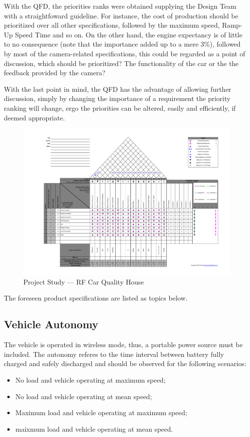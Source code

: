 With the QFD, the priorities ranks were obtained supplying the Design Team with a
straightfoward guideline. For instance, the cost of production should be
prioritized over all other specifications, followed by the maximum speed,
Ramp-Up Speed Time and so on.  On the other hand, the engine expectancy is of
little to no consequence (note that the importance added up to a mere 3\%),
followed by most of the camera-related specifications, this could be regarded as
a point of discussion, which should be prioritized? The functionality of the car
or the the feedback provided by the camera?

With the last point in mind, the QFD has the advantage of allowing further
discussion, simply by changing the importance of a requirement the priority ranking will change, ergo
the priorities can be altered, easily and efficiently, if deemed appropriate.
%
\begin{figure}[!htbp]
   \centering
       \includegraphics[page=1,width=1.0\textwidth]{sec/pdf/QFDv3.pdf} 
 \caption{Project Study --- RF Car Quality House}%
\label{fig:QFD}
\end{figure}
\newpage
The foreseen product specifications are listed as topics below.

\subsection{Vehicle Autonomy}%
\label{sec:autonomy-specs}
The vehicle is operated in wireless mode, thus, a portable power source must be included. The autonomy referes to the time interval between battery fully charged and safely discharged and should be observed for the following scenarios:
\begin{itemize}
\item No load and vehicle operating at maximum speed;
\item No load and vehicle operating at mean speed;
\item Maximum load and vehicle operating at maximum speed;
\item maixmum load and vehicle operating at mean speed.
\end{itemize}
